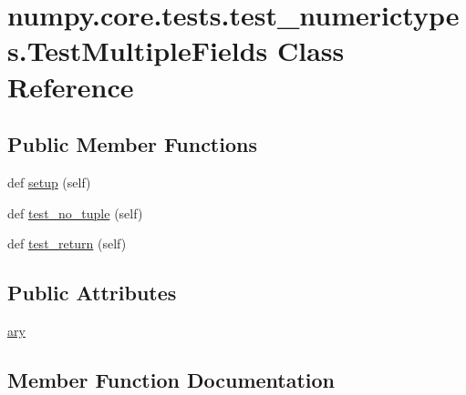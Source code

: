 \hypertarget{classnumpy_1_1core_1_1tests_1_1test__numerictypes_1_1TestMultipleFields}{}\section{numpy.\+core.\+tests.\+test\+\_\+numerictypes.\+Test\+Multiple\+Fields Class Reference}
\label{classnumpy_1_1core_1_1tests_1_1test__numerictypes_1_1TestMultipleFields}
\subsection*{Public Member Functions}
\begin{DoxyCompactItemize}
\item 
def \hyperlink{classnumpy_1_1core_1_1tests_1_1test__numerictypes_1_1TestMultipleFields_a143fa280bed03e51532e68c0372ff6d1}{setup} (self)
\item 
def \hyperlink{classnumpy_1_1core_1_1tests_1_1test__numerictypes_1_1TestMultipleFields_a689848be407ab1f9cf214d8d6e9d45f3}{test\+\_\+no\+\_\+tuple} (self)
\item 
def \hyperlink{classnumpy_1_1core_1_1tests_1_1test__numerictypes_1_1TestMultipleFields_ada0acb95f1b68a52919286e86863502b}{test\+\_\+return} (self)
\end{DoxyCompactItemize}
\subsection*{Public Attributes}
\begin{DoxyCompactItemize}
\item 
\hyperlink{classnumpy_1_1core_1_1tests_1_1test__numerictypes_1_1TestMultipleFields_a7a8b8dd6a71dbb9869c4487147b02858}{ary}
\end{DoxyCompactItemize}


\subsection{Member Function Documentation}
\mbox{\label{classnumpy_1_1core_1_1tests_1_1test__numerictypes_1_1TestMultipleFields_a143fa280bed03e51532e68c0372ff6d1}} 
